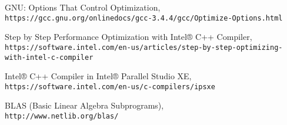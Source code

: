 \documentclass[a4paper,11pt]{article}
\begin{document}
\begin{thebibliography}{9}

GNU: Options That Control Optimization,
\\\texttt{https://gcc.gnu.org/onlinedocs/gcc-3.4.4/gcc/Optimize-Options.html}

Step by Step Performance Optimization with Intel® C++ Compiler,
\\\texttt{https://software.intel.com/en-us/articles/step-by-step-optimizing-with-intel-c-compiler}

Intel® C++ Compiler in Intel® Parallel Studio XE,
\\\texttt{https://software.intel.com/en-us/c-compilers/ipsxe}

BLAS (Basic Linear Algebra Subprograms),
\\\texttt{http://www.netlib.org/blas/}

\end{thebibliography}
\end{document}
